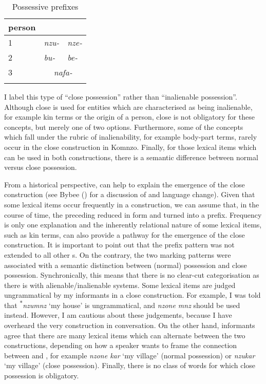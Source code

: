 \begin{table}
\caption{Possessive prefixes} 
\label{posspref}
	\begin{tabularx}{.5\textwidth}{XXl}
		\lsptoprule
		{person}&\Sg&\Nsg\\
		\midrule
		1&\emph{nzu-}&\emph{nze-}\\
		2&\emph{bu-}&\emph{be-}\\
		3&\multicolumn{2}{c}{\emph{nafa-}}\\
		\lspbottomrule
	\end{tabularx}	
\end{table}%

I label this type of  ``close possession'' rather than ``inalienable possession''. Although close  is used for entities which are characterised as being inalienable, for example kin terms or the origin of a person, close  is not obligatory for these concepts, but merely one of two options. Furthermore, some of the concepts which fall under the rubric of inalienability, for example body-part terms, rarely occur in the close  construction in Komnzo. Finally, for those lexical items which can be used in both  constructions, there is a semantic difference between normal versus close possession.

From a historical perspective,  can help to explain the emergence of the close  construction (see Bybee (\citeyear[142]{Bybee:2010wb}) for a discussion of  and language change). Given that some lexical items occur frequently in a  construction, we can assume that, in the course of time, the preceding  reduced in form and turned into a prefix. Frequency is only one explanation and the inherently relational nature of some lexical items, such as kin terms, can also provide a pathway for the emergence of the close  construction. It is important to point out that the prefix pattern was not extended to all other s. On the contrary, the two marking patterns were associated with a semantic distinction between (normal) possession and close possession. Synchronically, this means that there is no clear-cut categorisation as there is with alienable/inalienable systems. Some lexical items are judged ungrammatical by my informants in a close  construction. For example, I was told that \textsuperscript{$\ast$}\emph{nzumnz} `my house' is ungrammatical, and \emph{nzone mnz} should be used instead. However, I am cautious about these judgements, because I have overheard the very construction in conversation. On the other hand, informants agree that there are many lexical items which can alternate between the two  constructions, depending on how a speaker wants to frame the connection between  and , for example \emph{nzone kar} `my village' (normal possession) or \emph{nzukar} `my village' (close possession). Finally, there is no class of words for which close possession is obligatory.

